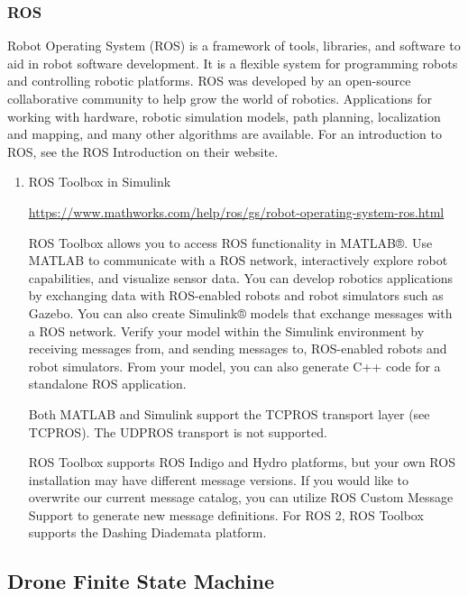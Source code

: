 \documentclass[unrestricted]{meetingnotesminutes}
\begin{document}
\subsubsection{ROS}
\label{sec:org9490141}
Robot Operating System (ROS) is a framework of tools, libraries, and software to aid in robot software development. It is a flexible system for programming robots and controlling robotic platforms. ROS was developed by an open-source collaborative community to help grow the world of robotics. Applications for working with hardware, robotic simulation models, path planning, localization and mapping, and many other algorithms are available. For an introduction to ROS, see the ROS Introduction on their website.

\begin{enumerate}
\item ROS Toolbox in Simulink
\label{sec:org3bcf87f}

\url{https://www.mathworks.com/help/ros/gs/robot-operating-system-ros.html}

ROS Toolbox allows you to access ROS functionality in MATLAB®. Use MATLAB to communicate with a ROS network, interactively explore robot capabilities, and visualize sensor data. You can develop robotics applications by exchanging data with ROS-enabled robots and robot simulators such as Gazebo. You can also create Simulink® models that exchange messages with a ROS network. Verify your model within the Simulink environment by receiving messages from, and sending messages to, ROS-enabled robots and robot simulators. From your model, you can also generate C++ code for a standalone ROS application.

Both MATLAB and Simulink support the TCPROS transport layer (see TCPROS). The UDPROS transport is not supported.

ROS Toolbox supports ROS Indigo and Hydro platforms, but your own ROS installation may have different message versions. If you would like to overwrite our current message catalog, you can utilize ROS Custom Message Support to generate new message definitions. For ROS 2, ROS Toolbox supports the Dashing Diademata platform.
\end{enumerate}

\subsection{Drone Finite State Machine}
\label{sec:org98f7613}
\end{document}
